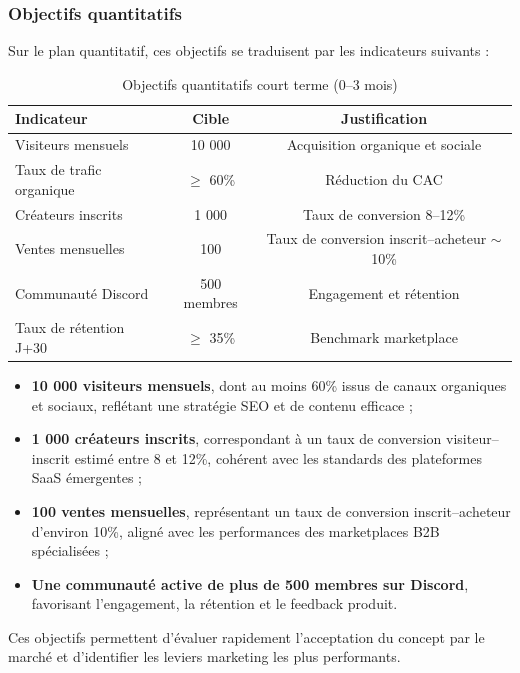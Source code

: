 \subsubsection{Objectifs quantitatifs}

Sur le plan quantitatif, ces objectifs se traduisent par les indicateurs suivants :

\begin{table}[H]
\centering
\caption{Objectifs quantitatifs court terme (0–3 mois)}
\label{tab:objectifs-court-terme}
\begin{tabular}{|l|c|c|}
\hline
\textbf{Indicateur} & \textbf{Cible} & \textbf{Justification} \\
\hline
Visiteurs mensuels & 10 000 & Acquisition organique et sociale \\
\hline
Taux de trafic organique & $\geq$ 60\% & Réduction du CAC \\
\hline
Créateurs inscrits & 1 000 & Taux de conversion 8–12\% \\
\hline
Ventes mensuelles & 100 & Taux de conversion inscrit–acheteur $\sim$10\% \\
\hline
Communauté Discord & 500 membres & Engagement et rétention \\
\hline
Taux de rétention J+30 & $\geq$ 35\% & Benchmark marketplace \\
\hline
\end{tabular}
\end{table}

\begin{itemize}
    \item \textbf{10 000 visiteurs mensuels}, dont au moins 60\% issus de canaux organiques et sociaux, reflétant une stratégie SEO et de contenu efficace ;
    \item \textbf{1 000 créateurs inscrits}, correspondant à un taux de conversion visiteur–inscrit estimé entre 8 et 12\%, cohérent avec les standards des plateformes SaaS émergentes ;
    \item \textbf{100 ventes mensuelles}, représentant un taux de conversion inscrit–acheteur d'environ 10\%, aligné avec les performances des marketplaces B2B spécialisées ;
    \item \textbf{Une communauté active de plus de 500 membres sur Discord}, favorisant l'engagement, la rétention et le feedback produit.
\end{itemize}

Ces objectifs permettent d'évaluer rapidement l'acceptation du concept par le marché et d'identifier les leviers marketing les plus performants.

